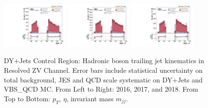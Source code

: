 \begin{figure}[!ht]
  \includegraphics[width=0.30\textwidth]{analysis_plots/2016_zjj/cr_vjets_l/dijet_m.pdf}
  \includegraphics[width=0.30\textwidth]{analysis_plots/2017_zjj/cr_vjets_l/dijet_m.pdf}
  \includegraphics[width=0.30\textwidth]{analysis_plots/2018_zjj/cr_vjets_l/dijet_m.pdf} \\
  \caption[DY+Jets Control Region: Hadronic boson trailing jet kinematics in Resolved ZV Channel]%
  {DY+Jets Control Region: Hadronic boson trailing jet kinematics in Resolved ZV Channel.
    Error bars include statistical uncertainty on total background,
    JES and QCD scale systematic on DY+Jets and VBS\_QCD MC\@. From Left to Right: 2016,
    2017, and 2018. From Top to Bottom: \( p_T \), \( \eta \), invariant mass \( m_{jj} \).}%
  \label{fig:zjj-cr-vjets-l-dijet2-pt-eta-m}
\end{figure}

